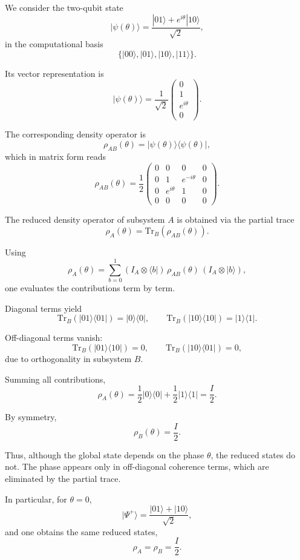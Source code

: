 \documentclass[a4paper]{article}
\begin{document}
We consider the two-qubit state
\[
|\psi(\theta)\rangle = \frac{|01\rangle + e^{i\theta}|10\rangle}{\sqrt{2}},
\]
in the computational basis
\[
\{|00\rangle, |01\rangle, |10\rangle, |11\rangle\}.
\]

Its vector representation is
\[
|\psi(\theta)\rangle =
\frac{1}{\sqrt{2}}
\begin{pmatrix}
0 \\
1 \\
e^{i\theta} \\
0
\end{pmatrix}.
\]

The corresponding density operator is
\[
\rho_{AB}(\theta) = |\psi(\theta)\rangle\langle\psi(\theta)|,
\]
which in matrix form reads
\[
\rho_{AB}(\theta)
=
\frac{1}{2}
\begin{pmatrix}
0 & 0 & 0 & 0 \\
0 & 1 & e^{-i\theta} & 0 \\
0 & e^{i\theta} & 1 & 0 \\
0 & 0 & 0 & 0
\end{pmatrix}.
\]

The reduced density operator of subsystem \(A\) is obtained via the partial trace
\[
\rho_A(\theta) = \mathrm{Tr}_B(\rho_{AB}(\theta)).
\]

Using
\[
\rho_A(\theta)
=
\sum_{b=0}^{1}
(I_A \otimes \langle b|)\,\rho_{AB}(\theta)\,(I_A \otimes |b\rangle),
\]
one evaluates the contributions term by term.

Diagonal terms yield
\[
\mathrm{Tr}_B(|01\rangle\langle 01|) = |0\rangle\langle 0|,
\qquad
\mathrm{Tr}_B(|10\rangle\langle 10|) = |1\rangle\langle 1|.
\]

Off-diagonal terms vanish:
\[
\mathrm{Tr}_B(|01\rangle\langle 10|) = 0,
\qquad
\mathrm{Tr}_B(|10\rangle\langle 01|) = 0,
\]
due to orthogonality in subsystem \(B\).

Summing all contributions,
\[
\rho_A(\theta)
=
\frac{1}{2}|0\rangle\langle 0|
+
\frac{1}{2}|1\rangle\langle 1|
=
\frac{I}{2}.
\]

By symmetry,
\[
\rho_B(\theta) = \frac{I}{2}.
\]

Thus, although the global state depends on the phase \( \theta \), the reduced states do not. The phase appears only in off-diagonal coherence terms, which are eliminated by the partial trace.

In particular, for \( \theta = 0 \),
\[
|\Psi^+\rangle = \frac{|01\rangle + |10\rangle}{\sqrt{2}},
\]
and one obtains the same reduced states,
\[
\rho_A = \rho_B = \frac{I}{2}.
\]
\end{document}
